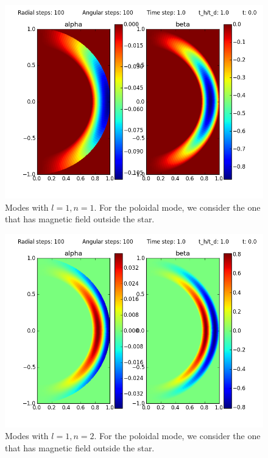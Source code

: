 \documentclass[letterpaper,10pt]{article}
\begin{document}
\begin{figure}
\begin{center}
\includegraphics[scale=0.6]{tests/plot_0}
\caption{Modes with $l=1,n=1$. For the poloidal mode, we consider the one that has magnetic field outside the star.}
\end{center}
\end{figure}

\begin{figure}
\begin{center}
\includegraphics[scale=0.6]{tests/plot_1}
\caption{Modes with $l=1,n=2$. For the poloidal mode, we consider the one that has magnetic field outside the star.}
\end{center}
\end{figure}
\end{document}
